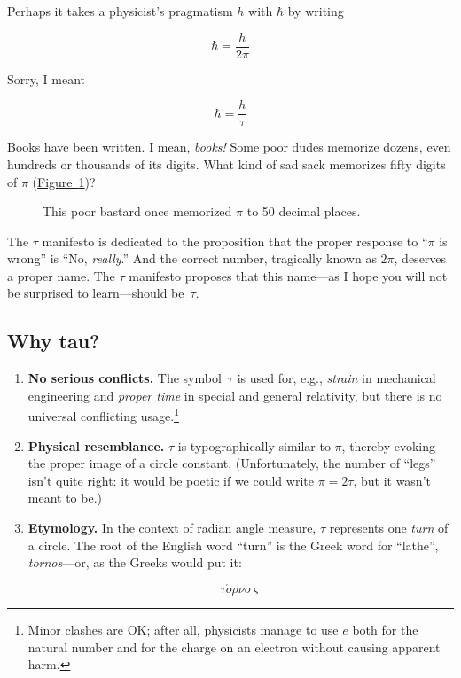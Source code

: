 \documentclass{article}
\begin{document}
Perhaps it takes a physicist's pragmatism $h$ with $\hbar$ by writing

\[ \hbar = \frac{h}{2\pi} \]

Sorry, I meant

\[ \hbar = \frac{h}{\tau} \]


Books have been written. I mean, \emph{books!} Some poor dudes memorize dozens, even hundreds or thousands of its digits. What kind of sad sack memorizes fifty digits of $\pi$ (\hyperref[fig:michael_hartl]{Figure~}\ref{fig:michael_hartl})?

\begin{figure}
\begin{center}
\end{center}
\caption{This poor bastard once memorized $\pi$ to 50 decimal places.\label{fig:michael_hartl}}
\end{figure}


The $\tau$ manifesto is dedicated to the proposition that the proper response to ``$\pi$ is wrong'' is ``No, \emph{really}.'' And the correct number, tragically known as $2\pi$, deserves a proper name. The $\tau$ manifesto proposes that this name---as I hope you will not be surprised to learn---should be~$\tau$.



  \subsection{Why tau?} %
  \label{sec:why_tau}
  

\begin{enumerate}
  \item \textbf{No serious conflicts.} The symbol~$\tau$ is used for, e.g., \emph{strain} in mechanical engineering and \emph{proper time} in special and general relativity, but there is no universal conflicting usage.\footnote{Minor clashes are OK; after all, physicists manage to use $e$ both for the natural number and for the charge on an electron without causing apparent harm.} 
  
  \item \textbf{Physical resemblance.} $\tau$ is typographically similar to $\pi$, thereby evoking the proper image of a circle constant. (Unfortunately, the number of ``legs'' isn't quite right: it would be poetic if we could write $\pi = 2\tau$, but it wasn't meant to be.)
  
  \item \textbf{Etymology.} In the context of radian angle measure, $\tau$ represents one \emph{turn} of a circle. The root of the English word ``turn'' is the Greek word for ``lathe'', \emph{tornos}---or, as the Greeks would put it: 
  
\[ \tau \acute{o}\rho\nu o\varsigma \]
  
\end{enumerate}
\end{document}
